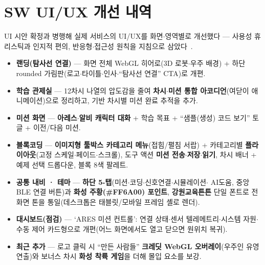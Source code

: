 \section{SW UI/UX 개선 내역}
UI 시안 확정과 병행해 실제 서비스의 UI/UX를 화면$\cdot$영역별로 개선했다 --- 사용성
휴리스틱과 인지적 편의, 반응형$\cdot$접근성 원칙을 지침으로 삼았다~\cite{norman2013design, nielsen1993usability, nielsen1994heuristics, krug2014dontmakemethink, marcotte2010responsive, wcag21}.

\smallskip
{}

\begin{itemize}
  \item \textbf{랜딩(탐사선 연결)} --- 화면 전체 WebGL 히어로(3D 로봇$\cdot$우주 배경) + 하단 rounded
  가림판(로고$\cdot$타이틀$\cdot$인사$\cdot$``탐사선 연결'' CTA)로 개편.
  \item \textbf{학습 관제실} --- 12차시 나열의 압도감을 줄여 \textbf{차시$\cdot$미션 통합 아코디언}(여닫이
  애니메이션)으로 정리하고,  기반 차시별 미션 완료 추적을 추가.
  \item \textbf{미션 화면} --- \textbf{아레스$\cdot$알비 캐릭터 대화} + 학습 목표 + ``샘플(생성) 코드 보기''
  토글 + 이전/다음 미션.
  \item \textbf{블록코딩} --- \textbf{이미지형 툴박스 카테고리 메뉴}(접힘/펼침 서랍) + 카테고리별
  \textbf{플라이아웃}(고정 스케일$\cdot$페이드$\cdot$스크롤), 도구 액션 \textbf{미션 전송$\cdot$저장$\cdot$읽기},
  차시 배너 + 예제 선택 드롭다운, 블록 8색 팔레트.
  \item \textbf{공통 내비 · 테마} --- \textbf{하단 5-탭}(미션$\cdot$코딩$\cdot$신호연결$\cdot$시뮬레이션$\cdot$%
  AI도움, 중앙 BLE 연결 버튼)과 \textbf{화성 주황(\#FF6A00) 포인트}, \textbf{강원교육튼튼} 단일 폰트로
  전 화면 톤을 통일(데스크톱은 태블릿/모바일 프레임 셸로 렌더).
  \item \textbf{대시보드(점검)} --- `ARES 미션 컨트롤': 연결 상태$\cdot$센서 텔레메트리$\cdot$시스템
  자원$\cdot$수동 제어 카드형으로 개편(어느 화면에서도 열고 닫으면 원위치 복귀).
  \item \textbf{최근 추가} --- 로고 클릭 시 ``만든 사람들'' \textbf{크레딧 WebGL 오버레이}(우주인 유영
  연출)와 보너스 차시 \textbf{화성 착륙 게임}을 더해 몰입 요소를 보강.
\end{itemize}

